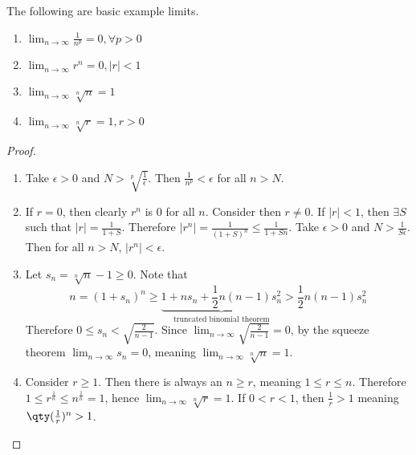 \documentclass[../notes.tex]{subfiles}
\begin{document}
\begin{example}
    The following are basic example limits.
    \begin{enumerate}
        \item $\lim_{n\to\infty} \frac{1}{n^p} = 0, \forall p > 0$
        \item $\lim_{n\to\infty} r^n = 0, |r| < 1$
        \item $\lim_{n\to\infty} \sqrt[n]{n} = 1$
        \item $\lim_{n\to\infty} \sqrt[n]{r} = 1, r > 0$
    \end{enumerate}
\end{example}

\begin{proof}
    \begin{enumerate}
        \item %
            Take $\epsilon > 0$ and $N > \sqrt[p]{\frac{1}{\epsilon}}$. Then $\frac{1}{n^p} < \epsilon$ for all $n > N$.
        \item %
            If $r = 0$, then clearly $r^n$ is $0$ for all $n$. Consider then $r \neq 0$. If $|r| < 1$, then $\exists S$ such that $|r| = \frac{1}{1+S}$. Therefore $|r^n| = \frac{1}{(1+S)^n} \leq \frac{1}{1+Sn}$. Take $\epsilon > 0$ and $N > \frac{1}{S \epsilon}$. Then for all $n > N$, $|r^n| < \epsilon$.
        \item %
            Let $s_n = \sqrt[n]{n} - 1 \geq 0$. Note that
            \[
                n = (1+ s_n)^n \geq \underbrace{1 + n s_n + \frac{1}{2} n (n-1) s_n^2}_{\text{truncated binomial theorem}} > \frac{1}{2} n(n-1) s_n^2
            \]
            Therefore $0 \leq s_n < \sqrt{\frac{2}{n-1}}$. Since $\lim_{n\to\infty} \sqrt{\frac{2}{n-1}} = 0$, by the squeeze theorem $\lim_{n\to\infty} s_n = 0$, meaning $\lim_{n\to\infty} \sqrt[n]{n} = 1$.
        \item %
            Consider $r \geq 1$. Then there is always an $n \geq r$, meaning $1 \leq r \leq n$. Therefore $1 \leq r^{\frac{1}{n}} \leq n^{\frac{1}{n}} = 1$, hence $\lim_{n\to\infty} \sqrt[n]{r} = 1$. If $0 < r < 1$, then $\frac{1}{r} > 1$ meaning $\qty(\frac{1}{r})^n > 1$. %
    \end{enumerate}
\end{proof}
\end{document}
